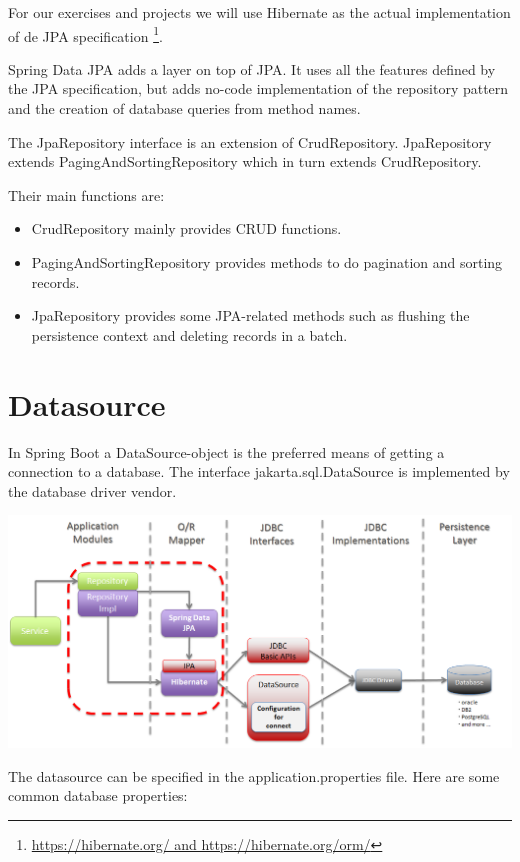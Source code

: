For our exercises and projects we will use Hibernate as the actual implementation of de JPA specification \footnote{\url{https://hibernate.org/ and https://hibernate.org/orm/}}.  

Spring Data JPA adds a layer on top of JPA. It uses all the features defined by the JPA specification, but adds no-code implementation of the repository pattern and the creation of database queries from method names.

The JpaRepository interface is an extension of CrudRepository.
JpaRepository extends PagingAndSortingRepository which in turn extends CrudRepository.

Their main functions are:

\begin{itemize}
\item CrudRepository mainly provides CRUD functions.
\item PagingAndSortingRepository provides methods to do pagination and sorting records.
\item JpaRepository provides some JPA-related methods such as flushing the persistence context and deleting records in a batch.
\end{itemize}


\section{Datasource}

In Spring Boot a DataSource-object is the preferred means of getting a connection to a database.
The interface jakarta.sql.DataSource is implemented by the database driver vendor. 

\includegraphics[width=\textwidth]{./images/chapter-jpa/springdatajpa}

The datasource can be specified in the application.properties file.
Here are some common database properties:

